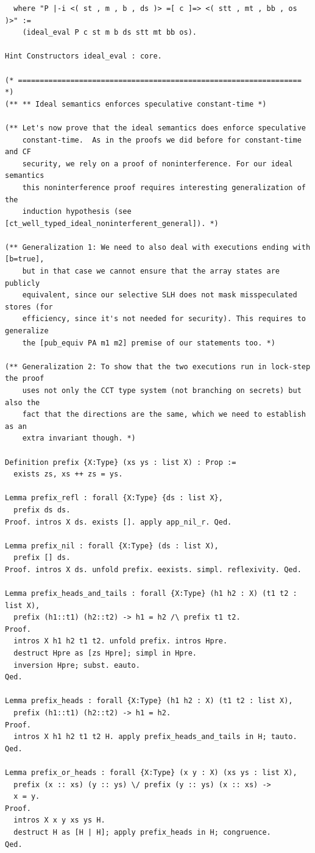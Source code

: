 \documentclass[12pt]{report}
\begin{document}
\begin{verbatim}
  where "P |-i <( st , m , b , ds )> =[ c ]=> <( stt , mt , bb , os )>" :=
    (ideal_eval P c st m b ds stt mt bb os).

Hint Constructors ideal_eval : core.

(* ================================================================= *)
(** ** Ideal semantics enforces speculative constant-time *)

(** Let's now prove that the ideal semantics does enforce speculative
    constant-time.  As in the proofs we did before for constant-time and CF
    security, we rely on a proof of noninterference. For our ideal semantics
    this noninterference proof requires interesting generalization of the
    induction hypothesis (see [ct_well_typed_ideal_noninterferent_general]). *)

(** Generalization 1: We need to also deal with executions ending with [b=true],
    but in that case we cannot ensure that the array states are publicly
    equivalent, since our selective SLH does not mask misspeculated stores (for
    efficiency, since it's not needed for security). This requires to generalize
    the [pub_equiv PA m1 m2] premise of our statements too. *)

(** Generalization 2: To show that the two executions run in lock-step the proof
    uses not only the CCT type system (not branching on secrets) but also the
    fact that the directions are the same, which we need to establish as an
    extra invariant though. *)

Definition prefix {X:Type} (xs ys : list X) : Prop :=
  exists zs, xs ++ zs = ys.

Lemma prefix_refl : forall {X:Type} {ds : list X},
  prefix ds ds.
Proof. intros X ds. exists []. apply app_nil_r. Qed.

Lemma prefix_nil : forall {X:Type} (ds : list X),
  prefix [] ds.
Proof. intros X ds. unfold prefix. eexists. simpl. reflexivity. Qed.

Lemma prefix_heads_and_tails : forall {X:Type} (h1 h2 : X) (t1 t2 : list X),
  prefix (h1::t1) (h2::t2) -> h1 = h2 /\ prefix t1 t2.
Proof.
  intros X h1 h2 t1 t2. unfold prefix. intros Hpre.
  destruct Hpre as [zs Hpre]; simpl in Hpre.
  inversion Hpre; subst. eauto.
Qed.

Lemma prefix_heads : forall {X:Type} (h1 h2 : X) (t1 t2 : list X),
  prefix (h1::t1) (h2::t2) -> h1 = h2.
Proof.
  intros X h1 h2 t1 t2 H. apply prefix_heads_and_tails in H; tauto.
Qed.

Lemma prefix_or_heads : forall {X:Type} (x y : X) (xs ys : list X),
  prefix (x :: xs) (y :: ys) \/ prefix (y :: ys) (x :: xs) ->
  x = y.
Proof.
  intros X x y xs ys H.
  destruct H as [H | H]; apply prefix_heads in H; congruence.
Qed.


\end{verbatim}
\end{document}
